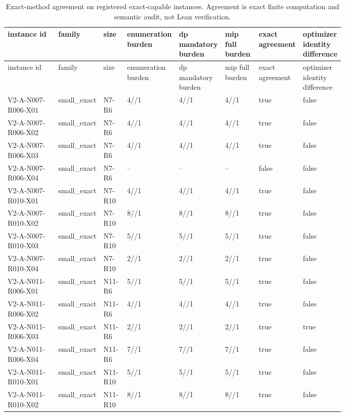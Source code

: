 {\footnotesize
\begin{longtable}{p{0.15\linewidth}p{0.09\linewidth}p{0.07\linewidth}p{0.10\linewidth}p{0.10\linewidth}p{0.10\linewidth}p{0.08\linewidth}p{0.08\linewidth}}
\caption{Exact-method agreement on registered exact-capable instances. Agreement is exact finite computation and semantic audit, not Lean verification.}\label{tab:aor-exact-method-agreement}\\
\toprule
instance id & family & size & enumeration burden & dp mandatory burden & mip full burden & exact agreement & optimizer identity difference \\
\midrule
\endfirsthead
\toprule
instance id & family & size & enumeration burden & dp mandatory burden & mip full burden & exact agreement & optimizer identity difference \\
\midrule
\endhead
V2-A-N007-R006-X01 & small\_exact & N7-R6 & 4//1 & 4//1 & 4//1 & true & false \\
V2-A-N007-R006-X02 & small\_exact & N7-R6 & 4//1 & 4//1 & 4//1 & true & false \\
V2-A-N007-R006-X03 & small\_exact & N7-R6 & 4//1 & 4//1 & 4//1 & true & false \\
V2-A-N007-R006-X04 & small\_exact & N7-R6 & -- & -- & -- & false & false \\
V2-A-N007-R010-X01 & small\_exact & N7-R10 & 4//1 & 4//1 & 4//1 & true & false \\
V2-A-N007-R010-X02 & small\_exact & N7-R10 & 8//1 & 8//1 & 8//1 & true & false \\
V2-A-N007-R010-X03 & small\_exact & N7-R10 & 5//1 & 5//1 & 5//1 & true & false \\
V2-A-N007-R010-X04 & small\_exact & N7-R10 & 2//1 & 2//1 & 2//1 & true & false \\
V2-A-N011-R006-X01 & small\_exact & N11-R6 & 5//1 & 5//1 & 5//1 & true & false \\
V2-A-N011-R006-X02 & small\_exact & N11-R6 & 4//1 & 4//1 & 4//1 & true & false \\
V2-A-N011-R006-X03 & small\_exact & N11-R6 & 2//1 & 2//1 & 2//1 & true & true \\
V2-A-N011-R006-X04 & small\_exact & N11-R6 & 7//1 & 7//1 & 7//1 & true & false \\
V2-A-N011-R010-X01 & small\_exact & N11-R10 & 5//1 & 5//1 & 5//1 & true & false \\
V2-A-N011-R010-X02 & small\_exact & N11-R10 & 8//1 & 8//1 & 8//1 & true & false \\

\end{longtable}}
